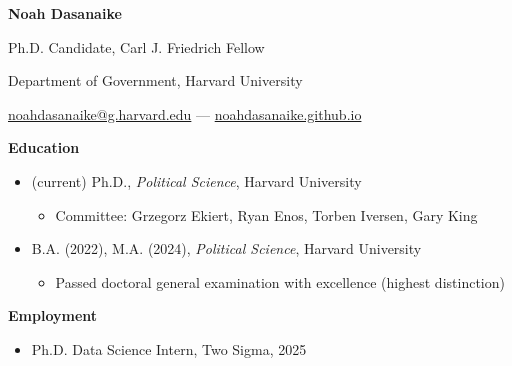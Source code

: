 \documentclass[12pt]{article}
\begin{document}
\begin{footnotesize} 

\begin{center}

{\bf {\large Noah Dasanaike}}

\vspace{3mm} 

Ph.D. Candidate, Carl J. Friedrich Fellow

Department of Government, Harvard University

\href{mailto:noahdasanaike@g.harvard.edu}{noahdasanaike@g.harvard.edu} — \href{https://noahdasanaike.github.io}{noahdasanaike.github.io}

\end{center}

\vspace{5mm} 


{\bf {\normalsize Education}}
\vspace{3mm} 

\begin{itemize}[noitemsep,nolistsep]
\item (current) Ph.D., \textit{Political Science}, Harvard University
\vspace{-1.5mm}
\begin{itemize}
\item Committee: Grzegorz Ekiert, Ryan Enos, Torben Iversen, Gary King
\end{itemize}
\item B.A. (2022), M.A. (2024), \textit{Political Science}, Harvard University
\vspace{-1.5mm}
\begin{itemize}
\item Passed doctoral general examination with excellence (highest distinction)
\end{itemize}
\end{itemize}

\vspace{3.5mm} 



{\bf {\normalsize Employment}}

\vspace{3mm} 

\begin{itemize}[noitemsep,nolistsep]

\item Ph.D. Data Science Intern, Two Sigma, 2025

\end{itemize}


\end{footnotesize}
\end{document}
